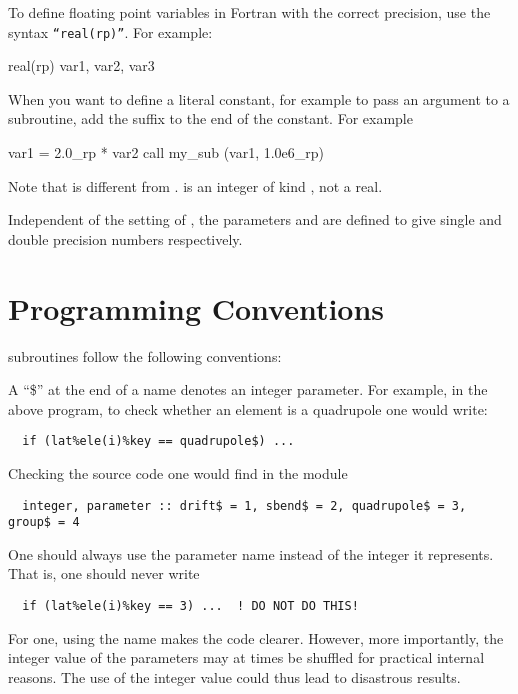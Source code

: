 {{{{{{To define floating point variables in Fortran with the correct precision,
 use the syntax {\tt ``real(rp)''}. For example:
\begin{example}
    real(rp) var1, var2, var3
\end{example}
When you want to define a literal constant, for example to pass an
argument to a subroutine, add the suffix  to the end of the
constant. For example
\begin{example}
   var1 =  2.0_rp * var2
   call my_sub (var1, 1.0e6_rp)
\end{example}
Note that  is different from .  is an
integer of kind , not a real.

Independent of the setting of , the parameters  and
 are defined to give single and double precision numbers
respectively.

\section{Programming Conventions}

\bmad subroutines follow the following conventions:

\begin{description}

\item[A ``\$'' suffix denotes a parameter:] 
A ``\$'' at the end of a name denotes an 
integer parameter. For example, in the above program, to check
whether an element is a quadrupole one would write:
\begin{verbatim}
  if (lat%ele(i)%key == quadrupole$) ...
\end{verbatim}
Checking the source code one would find in the module 
\begin{verbatim}
  integer, parameter :: drift$ = 1, sbend$ = 2, quadrupole$ = 3, group$ = 4
\end{verbatim}
One should always use the parameter name instead of the integer it represents.
That is, one should never write
\begin{verbatim}
  if (lat%ele(i)%key == 3) ...  ! DO NOT DO THIS!
\end{verbatim}
For one, using the name makes the code clearer. However, more
importantly, the integer value of the parameters may at times be
shuffled for practical internal reasons. The use of the integer value
could thus lead to disastrous results.  


\end{description}}}}}}}
